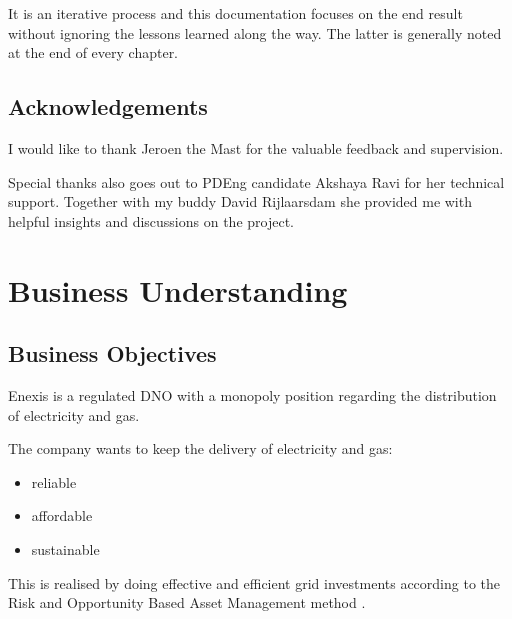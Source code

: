 \documentclass[letterpaper,10pt,english]{sphinxmanual}
\let\sphinxpxdimen\pdfpxdimen\else\newdimen\sphinxpxdimen
\begin{document}
It is an iterative process and this documentation focuses on the end result without ignoring the lessons learned along the way. The latter is generally noted at the end of every chapter.

\noindent{\hspace*{\fill}\sphinxincludegraphics[width=800\sphinxpxdimen]{{crisp_dm}.png}\hspace*{\fill}}


\section{Acknowledgements}
\label{\detokenize{general:acknowledgements}}
I would like to thank Jeroen the Mast for the valuable feedback and supervision.

Special thanks also goes out to PDEng candidate Akshaya Ravi for her technical support. Together with my buddy David Rijlaarsdam she provided me with helpful insights and discussions on the project.


\chapter{Business Understanding}
\label{\detokenize{business_understanding:business-understanding}}\label{\detokenize{business_understanding::doc}}

\section{Business Objectives}
\label{\detokenize{business_understanding:business-objectives}}
Enexis is a regulated DNO with a monopoly position regarding the distribution of electricity and gas.

The company wants to keep the delivery of electricity and gas:
\begin{itemize}
\item {} 
reliable

\item {} 
affordable

\item {} 
sustainable

\end{itemize}

This is realised by doing effective and efficient grid investments according to the Risk and Opportunity Based Asset Management method .
\end{document}
